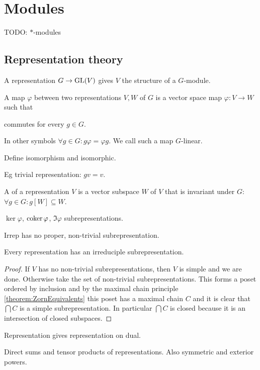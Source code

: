 \chapter{Modules}
TODO: $*$-modules
\section{Representation theory}
A representation $G\to \operatorname{GL}(V)$ gives $V$ the structure of a $G$-module.

A map $\varphi$ between two representations $V,W$ of $G$ is a vector space map $\varphi: V\to W$ such that
\begin{center}
commutes for every $g\in G$.
\end{center}
In other symbols $\forall g\in G: g\varphi = \varphi g$.
We call such a map $G$-linear.

Define isomorphism and isomorphic.

Eg trivial representation: $gv = v$.

A  of a representation $V$ is a vector subspace $W$ of $V$ that is invariant under $G$: $\forall g\in G: g[W]\subseteq W$.

$\ker \varphi$, $\operatorname{coker} \varphi$, $\Im \varphi$ subrepresentations.

Irrep has no proper, non-trivial subrepresentation.

\begin{lemma} \label{lemma:existenceIrreps}
Every representation has an irreduciple subrepresentation.
\end{lemma}
\begin{proof}
If $V$ has no non-trivial subrepresentations, then $V$ is simple and we are done. 
Otherwise take the set of non-trivial subrepresentations. This forms a poset ordered by inclusion and by the maximal chain principle \ref{theorem:ZornEquivalents} this poset has a maximal chain $C$ and it is clear that $\bigcap C$ is a simple subrepresentation. In particular $\bigcap C$ is closed because it is an intersection of closed subspaces.
\end{proof}

Representation gives representation on dual.

Direct sums and tensor products of representations. Also symmetric and exterior powers.

